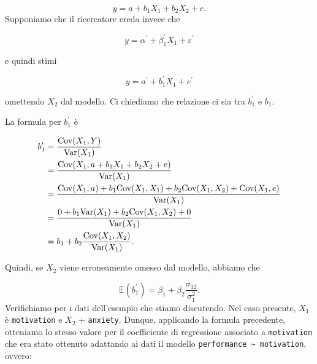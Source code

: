 \documentclass[
  11pt,
]{krantz}
\makeatletter
\newenvironment{Shaded}{\begin{snugshade}}{\end{snugshade}}
\newcommand{\CommentTok}[1]{\textcolor[rgb]{0.37,0.37,0.37}{\textit{#1}}}
\newcommand{\DecValTok}[1]{\textcolor[rgb]{0.06,0.06,0.06}{#1}}
\newcommand{\FunctionTok}[1]{\textcolor[rgb]{0,0,0}{#1}}
\newcommand{\NormalTok}[1]{#1}
\newcommand{\SpecialCharTok}[1]{\textcolor[rgb]{0,0,0}{#1}}
\newenvironment{kframe}{%
\medskip{}
\setlength{\fboxsep}{.8em}
 \def\at@end@of@kframe{}%
 \ifinner\ifhmode%
  \def\at@end@of@kframe{\end{minipage}}%
  \begin{minipage}{\columnwidth}%
 \fi\fi%
 \def\FrameCommand##1{\hskip\@totalleftmargin \hskip-\fboxsep
 \colorbox{shadecolor}{##1}\hskip-\fboxsep
     \hskip-\linewidth \hskip-\@totalleftmargin \hskip\columnwidth}%
 \MakeFramed {\advance\hsize-\width
   \@totalleftmargin\z@ \linewidth\hsize
   \@setminipage}}%
 {\par\unskip\endMakeFramed%
 \at@end@of@kframe}
\renewenvironment{Shaded}{\begin{kframe}}{\end{kframe}}
\theoremstyle{definition}
\theoremstyle{definition}
\theoremstyle{definition}
\theoremstyle{definition}
\theoremstyle{remark}
\makeatother
\begin{document}
\[
y = a + b_1 X_1 + b_2 X_2 + e.
\] Supponiamo che il ricercatore creda invece che

\[
y = \alpha^\prime + \beta_1^\prime X_1 + \varepsilon^\prime
\]

e quindi stimi

\[
y = a^\prime + b_1^\prime X_1 + e^\prime
\]

omettendo \(X_2\) dal modello. Ci chiediamo che relazione ci sia tra \(b_1^\prime\) e \(b_1\).

La formula per \(b_1^\prime\) è

\begin{equation}
\begin{aligned}
b_1^\prime &= \frac{\mbox{Cov}(X_1, Y)}{\mbox{Var}(X_1)}\notag\\
&= \frac{\mbox{Cov}(X_1, a + b_1 X_1 + b_2 X_2 + e)}{\mbox{Var}(X_1)}\notag\\
&= \frac{\mbox{Cov}(X_1, a)+b_1 \mbox{Cov}(X_1, X_1) + b_2 \mbox{Cov}(X_1, X_2) + \mbox{Cov}(X_1, e)}{\mbox{Var}(X_1)}\notag\\
&= \frac{0 + b_1 \mbox{Var}(X_1) + b_2 \mbox{Cov}(X_1, X_2) + 0}{\mbox{Var}(X_1)}\notag\\
&= b_1 + b_2 \frac{\mbox{Cov}(X_1, X_2)}{\mbox{Var}(X_1)}.
\end{aligned}
\end{equation}

Quindi, se \(X_2\) viene erroneamente omesso dal modello, abbiamo che

\[
\mathbb{E}(b_1^\prime) = \beta_1 + \beta_2 \frac{\sigma_{12}}{\sigma_1^2}.
\] Verifichiamo per i dati dell'esempio che stiamo discutendo. Nel caso presente, \(X_1\) è \texttt{motivation} e \(X_2\) + \texttt{anxiety}. Dunque, applicando la formula precedente, otteniamo lo stesso valore per il coefficiente di regressione associato a \texttt{motivation} che era stato ottenuto adattando ai dati il modello \texttt{performance\ \textasciitilde{}\ motivation}, ovvero:

\begin{Shaded}
\end{Shaded}
\end{document}
